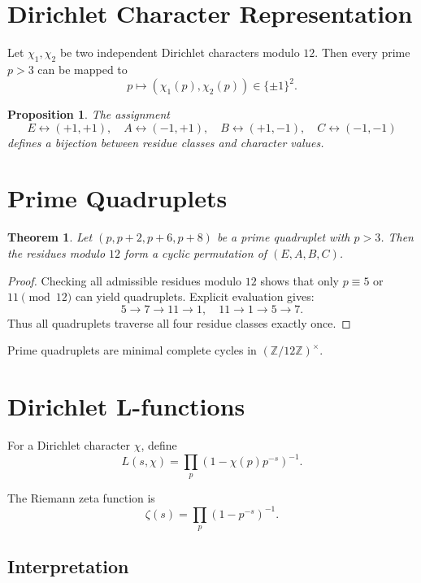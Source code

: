 \documentclass[11pt]{article}
\newtheorem{theorem}{Theorem}
\newtheorem{proposition}{Proposition}
\begin{document}
\section{Dirichlet Character Representation}

Let $\chi_1, \chi_2$ be two independent Dirichlet characters modulo $12$.
Then every prime $p>3$ can be mapped to
\[
p \mapsto (\chi_1(p), \chi_2(p)) \in \{\pm1\}^2.
\]

\begin{proposition}
The assignment
\[
E \leftrightarrow (+1,+1),\quad
A \leftrightarrow (-1,+1),\quad
B \leftrightarrow (+1,-1),\quad
C \leftrightarrow (-1,-1)
\]
defines a bijection between residue classes and character values.
\end{proposition}

\section{Prime Quadruplets}

\begin{theorem}
Let $(p,p+2,p+6,p+8)$ be a prime quadruplet with $p>3$. 
Then the residues modulo $12$ form a cyclic permutation of $(E,A,B,C)$.
\end{theorem}

\begin{proof}
Checking all admissible residues modulo $12$ shows that only 
$p \equiv 5$ or $11 \pmod{12}$ can yield quadruplets. 
Explicit evaluation gives:
\[
5 \to 7 \to 11 \to 1, \quad
11 \to 1 \to 5 \to 7.
\]
Thus all quadruplets traverse all four residue classes exactly once.
\end{proof}

\begin{corollary}
Prime quadruplets are minimal complete cycles in $(\mathbb{Z}/12\mathbb{Z})^\times$.
\end{corollary}

\section{Dirichlet L-functions}

For a Dirichlet character $\chi$, define
\[
L(s,\chi) = \prod_{p} (1 - \chi(p)p^{-s})^{-1}.
\]

The Riemann zeta function is
\[
\zeta(s) = \prod_p (1 - p^{-s})^{-1}.
\]

\subsection{Interpretation}
\end{document}
